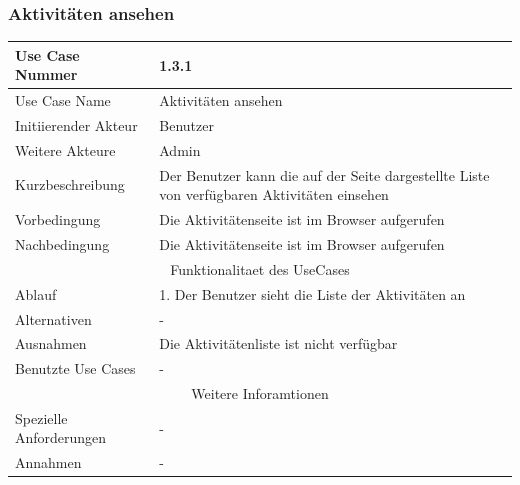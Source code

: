 \documentclass[10pt,a4paper]{article}
\begin{document}
	\subsubsection{Aktivit\"aten ansehen}
	\begin{tabular}{|l|p{.5\linewidth}|}
	\hline Use Case Nummer & 1.3.1 \\ 
	\hline Use Case Name & Aktivit\"aten ansehen \\ 
	\hline Initiierender Akteur & Benutzer \\
	\hline Weitere Akteure & Admin \\
	\hline Kurzbeschreibung & Der Benutzer kann die auf der Seite dargestellte Liste von verf\"ugbaren Aktivit\"aten einsehen \\
	\hline Vorbedingung & Die Aktivit\"atenseite ist im Browser aufgerufen \\
	\hline Nachbedingung & Die Aktivit\"atenseite ist im Browser aufgerufen \\
	\hline \multicolumn{2}{|c|}{Funktionalitaet des UseCases}\\
	\hline Ablauf & 1. Der Benutzer sieht die Liste der Aktivit\"aten an \\
	\hline Alternativen & - \\
	\hline Ausnahmen & Die Aktivit\"atenliste ist nicht verf\"ugbar \\
	\hline Benutzte Use Cases & - \\
	\hline \multicolumn{2}{|c|}{Weitere Inforamtionen} \\
	\hline Spezielle Anforderungen & - \\
	\hline Annahmen & - \\
	\hline
	\end{tabular} 
\end{document}
